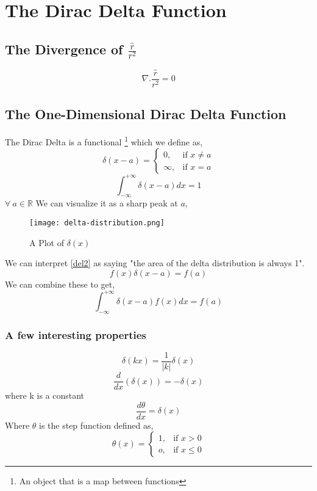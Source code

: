 \section{The Dirac Delta Function}
\subsection{The Divergence of $\frac{\hat{r}}{r^{2}}$}
\begin{equation}
\nabla . \frac{\hat{r}}{r^{2}} = 0
\end{equation}
\subsection{The One-Dimensional Dirac Delta Function}
The Dirac Delta is a functional \footnote{An object that is a map between functions} which we define as,
\begin{equation}
\delta(x-a)= 
\begin{cases}
0, & \text{if } x \neq a\\
\infty,              & \text{if } x = a
\end{cases}
\label{del1}
\end{equation}
\begin{equation}
\int_{- \infty}^{+ \infty} \delta(x-a) dx = 1
\label{del2}
\end{equation}
$\forall \  a \in \mathbb{R}$
We can visualize it as a sharp peak at $a$,
\begin{figure}
\centering
\texttt{[image: delta-distribution.png]}
\caption{A Plot of $\delta(x)$}
\end{figure}
We can interpret \ref{del2} as saying "the area of the delta distribution is always 1".
\begin{equation}
f(x)\delta(x - a ) = f(a)
\end{equation}
We can combine these to get,
\begin{equation}
\int_{- \infty}^{+ \infty} \delta(x-a) f(x) dx = f(a)
\end{equation}
\subsubsection{A few interesting properties}
\begin{equation}
\delta(kx) = \frac{1}{|k|}\delta(x)
\end{equation}
\begin{equation}
\frac{d}{dx}(\delta(x)) = -\delta(x)
\end{equation}
where k is a constant
\begin{equation}
\frac{d \theta}{dx} = \delta(x)
\end{equation}
Where $\theta$ is the step function defined as,
\begin{equation}
\theta(x)= 
\begin{cases}
1, & \text{if } x > 0\\
o,              & \text{if } x \leq 0
\end{cases}
\end{equation}

